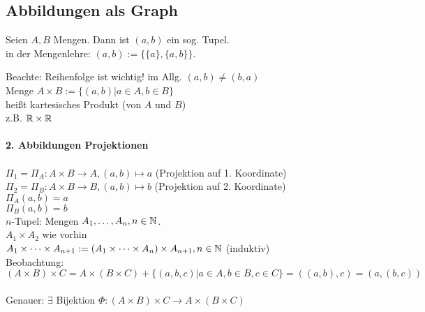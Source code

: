 \documentclass[../ana1.tex]{subfiles}
\begin{document}
\subsection{Abbildungen als Graph}
\begin{defi}
	Seien \(A,B\) Mengen. Dann ist \((a,b)\) ein sog. Tupel.\\
	in der Mengenlehre: \((a,b) := \{ \{a\}, \{a,b\} \} \).
\end{defi}
Beachte: Reihenfolge ist wichtig! im Allg. \( (a,b)\neq (b,a) \) \\
Menge \( A\times B := \{(a,b)|a\in A, b\in B\} \) \\
heißt kartesisches Produkt (von \(A\) und \(B\)) \\
z.B. \( \mathbb{R}\times\mathbb{R} \) \\
\\
\textbf{2. Abbildungen Projektionen}\\
\\
\(\Pi_1 = \Pi_A : A\times B \rightarrow A, (a,b)\mapsto a\) (Projektion auf 1. Koordinate)\\
\(\Pi_2 = \Pi_B : A\times B \rightarrow B, (a,b) \mapsto b\) (Projektion auf 2. Koordinate)\\
\(\Pi_A(a,b) = a\) \\
\(\Pi_B(a,b) = b\) \\
\(n\)-Tupel: Mengen \(A_1,\dots ,A_n, n\in \mathbb{N} \).\\
\(A_1\times A_2\) wie vorhin\\
\(A_1\times\cdots\times A_{n+1} := (A_1\times\cdots\times A_n)\times A_{n+1}, n\in \mathbb{N} \) (induktiv)\\
Beobachtung:\\
\[ (A\times B)\times C = A\times (B\times C) + \{(a,b,c)|a\in A, b\in B, c\in C\} = ((a,b),c) = (a,(b,c))\] \\
Genauer: \( \exists \) Bijektion \(\Phi : (A\times B) \times C \rightarrow A\times (B\times C)\)
\end{document}
